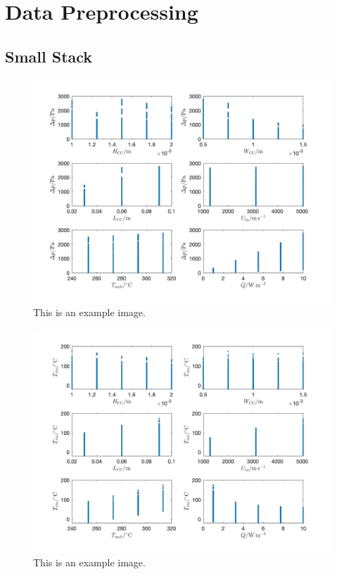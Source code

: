 \section{Data Preprocessing}
    \subsection{Small Stack}
        \begin{figure}[H]
            \centering
            \includegraphics[width=1\textwidth]{00_Images/00_Small_Stack_Images/00_Pressure_Drop_vs_Features_July_10_2024_v1.jpg}  %
            \caption{This is an example image.}
            \label{fig:example1}
        \end{figure}

        \begin{figure}[H]
            \centering
            \includegraphics[width=1\textwidth]{00_Images/00_Small_Stack_Images/00_Temperature_vs_Features_July_10_2024_v1.jpg}  %
            \caption{This is an example image.}
            \label{fig:example1}
        \end{figure}

